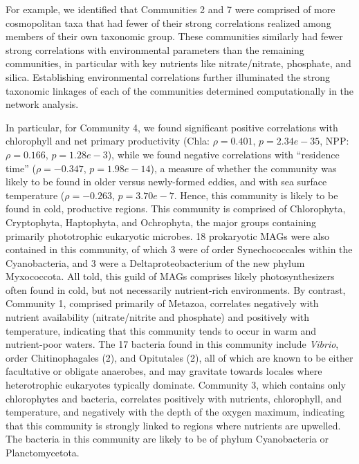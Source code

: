 \documentclass[12pt]{article}
\numberwithin{equation}{section}
\begin{document}
For example, we identified that Communities 2 and 7 were comprised of more cosmopolitan taxa that had fewer of their strong correlations realized among members of their own taxonomic group. These communities similarly had fewer strong correlations with environmental parameters than the remaining communities, in particular with key nutrients like nitrate/nitrate, phosphate, and silica. Establishing environmental correlations further illuminated the strong taxonomic linkages of each of the communities determined computationally in the network analysis. 

In particular, for Community 4, we found significant positive correlations with chlorophyll and net primary productivity (Chla: $\rho=0.401$, $p=2.34e-35$, NPP: $\rho=0.166$, $p=1.28e-3$), while we found negative correlations with ``residence time'' ($\rho=-0.347$, $p=1.98e-14$), a measure of whether the community was likely to be found in older versus newly-formed eddies, and with sea surface temperature ($\rho=-0.263$, $p=3.70e-7$. Hence, this community is likely to be found in cold, productive regions. This community is comprised of Chlorophyta, Cryptophyta, Haptophyta, and Ochrophyta, the major groups containing primarily phototrophic eukaryotic microbes. 18 prokaryotic MAGs were also contained in this community, of which 3 were of order Synechococcales within the Cyanobacteria, and 3 were a Deltaproteobacterium of the new phylum Myxococcota. All told, this guild of MAGs comprises likely photosynthesizers often found in cold, but not necessarily nutrient-rich environments. By contrast, Community 1, comprised primarily of Metazoa, correlates negatively with nutrient availability (nitrate/nitrite and phosphate) and positively with temperature, indicating that this community tends to occur in warm and nutrient-poor waters. The 17 bacteria found in this community include \textit{Vibrio}, order Chitinophagales (2), and Opitutales (2), all of which are known to be either facultative or obligate anaerobes, and may gravitate towards locales where heterotrophic eukaryotes typically dominate. Community 3, which contains only chlorophytes and bacteria, correlates positively with nutrients, chlorophyll, and temperature, and negatively with the depth of the oxygen maximum, indicating that this community is strongly linked to regions where nutrients are upwelled. The bacteria in this community are likely to be of phylum Cyanobacteria or Planctomycetota. 

\end{document}
